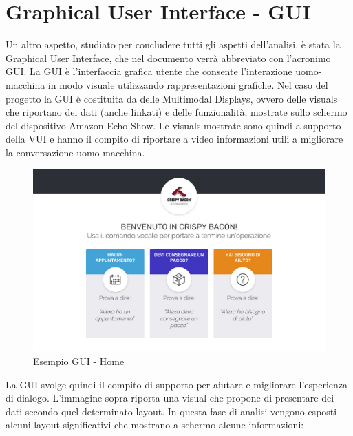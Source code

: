 \section{Graphical User Interface - GUI}
Un altro aspetto, studiato per concludere tutti gli aspetti dell'analisi, è stata la Graphical User Interface, che nel documento verrà abbreviato con l'acronimo GUI. La GUI è l'interfaccia grafica utente che consente l’interazione uomo-macchina in modo visuale utilizzando rappresentazioni grafiche. Nel caso del progetto la GUI è costituita da delle Multimodal Displays, ovvero delle visuals che riportano dei dati (anche linkati) e delle funzionalità, mostrate sullo schermo del dispositivo Amazon Echo Show. Le visuals mostrate sono quindi a supporto della VUI e hanno il compito di riportare a video informazioni utili a migliorare la conversazione uomo-macchina.
\\
\begin{figure}[H] 
    \centering 
    \includegraphics[width=1\columnwidth]{immagini/home_gui.jpg}
    \caption{\label{fig:esempioGUI}Esempio GUI - Home}
\end{figure}
\newpage
\noindent La GUI svolge quindi il compito di supporto per aiutare e migliorare l’esperienza di dialogo. L’immagine sopra riporta una visual che propone di presentare dei dati secondo quel determinato layout. In questa fase di analisi vengono esposti alcuni layout significativi che mostrano a schermo alcune informazioni:
\\[0.4cm]
